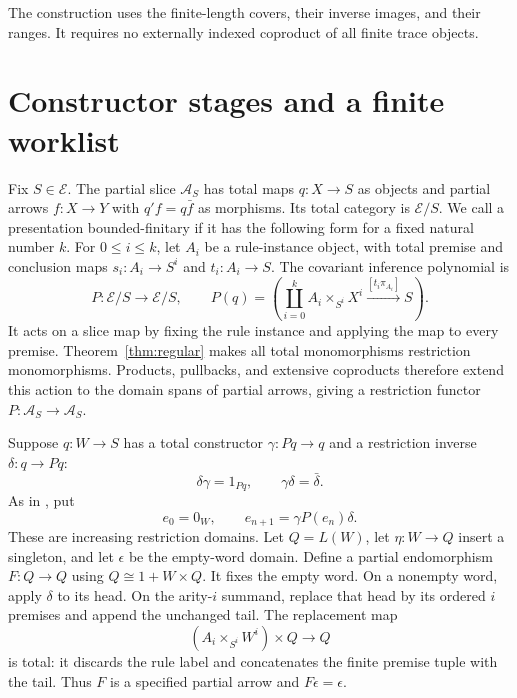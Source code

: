 \documentclass[11pt]{article}
\theoremstyle{definition}\newtheorem{definition}[theorem]{Definition}
\theoremstyle{remark}\newtheorem{remark}[theorem]{Remark}
\newcommand{\A}{\mathscr A}
\newcommand{\E}{\mathscr E}
\begin{document}
The construction uses the finite-length covers, their inverse images,
and their ranges. It requires no externally indexed coproduct of all
finite trace objects.

\section{Constructor stages and a finite worklist}\label{sec:worklist}

Fix $S\in\E$. The partial slice $\A_S$ has total maps
$q:X\to S$ as objects and partial arrows $f:X\to Y$ with
$q'f=q\bar f$ as morphisms. Its total category is $\E/S$.
We call a presentation bounded-finitary if it has the following
form for a fixed natural number $k$.
For $0\le i\le k$, let $A_i$ be a rule-instance object, with
total premise and conclusion maps $s_i:A_i\to S^i$ and
$t_i:A_i\to S$. The covariant inference polynomial is
\[
 P:\E/S\to\E/S,\qquad
 P(q)=\left(\coprod_{i=0}^k A_i\times_{S^i}X^i
       \xrightarrow{[t_i\pi_{A_i}]}S\right).
\]
It acts on a slice map by fixing the rule instance and applying the
map to every premise. Theorem~\ref{thm:regular} makes all total
monomorphisms restriction monomorphisms. Products, pullbacks, and
extensive coproducts therefore extend this action to the domain
spans of partial arrows, giving a restriction functor
$P:\A_S\to\A_S$.

Suppose $q:W\to S$ has a total constructor
$\gamma:Pq\to q$ and a restriction inverse $\delta:q\to Pq$:
\[
 \delta\gamma=1_{Pq},\qquad\gamma\delta=\bar\delta.
\]
As in \cite[Theorem~2.1]{FiniteProofs}, put
\begin{equation}\label{eq:stages}
 e_0=0_W,\qquad e_{n+1}=\gamma P(e_n)\delta.
\end{equation}
These are increasing restriction domains. Let $Q=L(W)$, let
$\eta:W\to Q$ insert a singleton, and let $\epsilon$ be the
empty-word domain. Define a partial endomorphism $F:Q\to Q$
using $Q\cong1+W\times Q$. It fixes the empty word. On a
nonempty word, apply $\delta$ to its head. On the arity-$i$
summand, replace that head by its ordered $i$ premises and append
the unchanged tail. The replacement map
\[
 (A_i\times_{S^i}W^i)\times Q\longrightarrow Q
\]
is total: it discards the rule label and concatenates the finite
premise tuple with the tail. Thus $F$ is a specified partial arrow
and $F\epsilon=\epsilon$.
\end{document}
